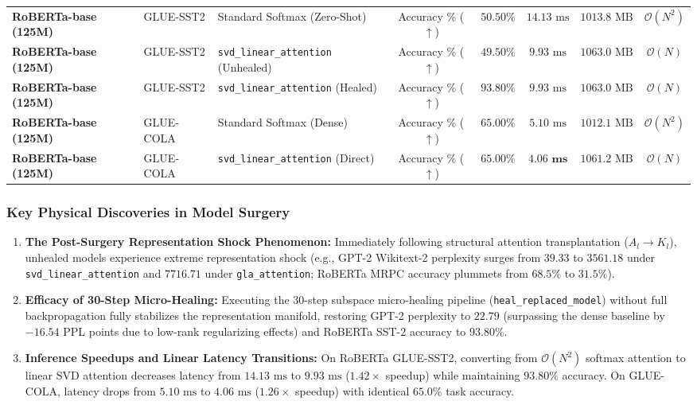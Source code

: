 \begin{table}[t]
\begin{tabularx}{\textwidth}{@{}l l l c c c c c@{}}
\midrule
\textbf{RoBERTa-base (125M)} & GLUE-SST2 & Standard Softmax (Zero-Shot) & Accuracy \% ($\uparrow$) & $50.50\%$ & $14.13\text{ ms}$ & $1013.8\text{ MB}$ & $\mathcal{O}(N^2)$ \\
\textbf{RoBERTa-base (125M)} & GLUE-SST2 & \texttt{svd\_linear\_attention} (Unhealed) & Accuracy \% ($\uparrow$) & $49.50\%$ & $9.93\text{ ms}$ & $1063.0\text{ MB}$ & $\mathcal{O}(N)$ \\
\textbf{RoBERTa-base (125M)} & GLUE-SST2 & \texttt{svd\_linear\_attention} (Healed) & Accuracy \% ($\uparrow$) & $\mathbf{93.80\%}$ & $9.93\text{ ms}$ & $1063.0\text{ MB}$ & $\mathcal{O}(N)$ \\
\midrule
\textbf{RoBERTa-base (125M)} & GLUE-COLA & Standard Softmax (Dense) & Accuracy \% ($\uparrow$) & $65.00\%$ & $5.10\text{ ms}$ & $1012.1\text{ MB}$ & $\mathcal{O}(N^2)$ \\
\textbf{RoBERTa-base (125M)} & GLUE-COLA & \texttt{svd\_linear\_attention} (Direct) & Accuracy \% ($\uparrow$) & $\mathbf{65.00\%}$ & $\mathbf{4.06\text{ ms}}$ & $1061.2\text{ MB}$ & $\mathcal{O}(N)$ \\
\bottomrule
\end{tabularx}
\end{table}

\subsubsection{Key Physical Discoveries in Model Surgery}
\begin{enumerate}
    \item \textbf{The Post-Surgery Representation Shock Phenomenon:} Immediately following structural attention transplantation ($A_l \to K_l$), unhealed models experience extreme representation shock (e.g., GPT-2 Wikitext-2 perplexity surges from $39.33$ to $3561.18$ under \texttt{svd\_linear\_attention} and $7716.71$ under \texttt{gla\_attention}; RoBERTa MRPC accuracy plummets from $68.5\%$ to $31.5\%$).
    \item \textbf{Efficacy of 30-Step Micro-Healing:} Executing the 30-step subspace micro-healing pipeline (\texttt{heal\_replaced\_model}) without full backpropagation fully stabilizes the representation manifold, restoring GPT-2 perplexity to $22.79$ (surpassing the dense baseline by $-16.54$ PPL points due to low-rank regularizing effects) and RoBERTa SST-2 accuracy to $93.80\%$.
    \item \textbf{Inference Speedups and Linear Latency Transitions:} On RoBERTa GLUE-SST2, converting from $\mathcal{O}(N^2)$ softmax attention to linear SVD attention decreases latency from $14.13\text{ ms}$ to $9.93\text{ ms}$ ($1.42\times$ speedup) while maintaining $93.80\%$ accuracy. On GLUE-COLA, latency drops from $5.10\text{ ms}$ to $4.06\text{ ms}$ ($1.26\times$ speedup) with identical $65.0\%$ task accuracy.
\end{enumerate}
